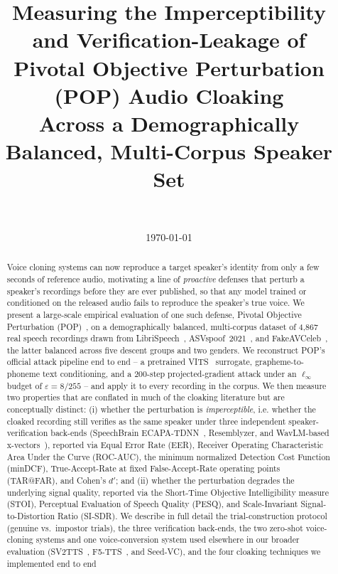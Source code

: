 \documentclass[11pt]{article}
\title{Measuring the Imperceptibility and Verification-Leakage of\\
Pivotal Objective Perturbation (POP) Audio Cloaking\\
Across a Demographically Balanced, Multi-Corpus Speaker Set}
\author{
  \todo{Author names}\\
  \todo{Affiliation}
}
\date{\today}
\begin{document}
\maketitle

\begin{abstract}
Voice cloning systems can now reproduce a target speaker's identity
from only a few seconds of reference audio, motivating a line of
\emph{proactive} defenses that perturb a speaker's recordings before
they are ever published, so that any model trained or conditioned on
the released audio fails to reproduce the speaker's true voice. We
present a large-scale empirical evaluation of one such defense,
Pivotal Objective Perturbation (POP)~\cite{zhang2024mitigating}, on a
demographically balanced, multi-corpus dataset of 4,867 real speech
recordings drawn from LibriSpeech~\cite{panayotov2015librispeech},
ASVspoof~2021~\cite{yamagishi2021asvspoof}, and
FakeAVCeleb~\cite{khalid2021fakeavceleb}, the latter balanced across
five descent groups and two genders. We reconstruct POP's official
attack pipeline end to end -- a pretrained VITS~\cite{kim2021vits}
surrogate, grapheme-to-phoneme text conditioning, and a 200-step
projected-gradient attack under an $\ell_\infty$ budget of
$\varepsilon=8/255$ -- and apply it to every recording in the corpus.
We then measure two properties that are conflated in much of the
cloaking literature but are conceptually distinct: (i) whether the
perturbation is \emph{imperceptible}, i.e. whether the cloaked
recording still verifies as the same speaker under three independent
speaker-verification back-ends (SpeechBrain
ECAPA-TDNN~\cite{desplanques2020ecapa}, Resemblyzer, and
WavLM-based x-vectors~\cite{chen2022wavlm}), reported via Equal Error
Rate (EER), Receiver Operating Characteristic Area Under the Curve
(ROC-AUC), the minimum normalized Detection Cost Function (minDCF),
True-Accept-Rate at fixed False-Accept-Rate operating points
(TAR@FAR), and Cohen's $d'$; and (ii) whether the perturbation
degrades the underlying signal quality, reported via the Short-Time
Objective Intelligibility measure (STOI), Perceptual Evaluation of
Speech Quality (PESQ), and Scale-Invariant Signal-to-Distortion Ratio
(SI-SDR). We describe in full detail the trial-construction protocol
(genuine vs.\ impostor trials), the three verification back-ends, the
two zero-shot voice-cloning systems and one voice-conversion system
used elsewhere in our broader evaluation
(SV2TTS~\cite{jia2018transfer}, F5-TTS~\cite{chen2024f5tts}, and
Seed-VC), and the four cloaking techniques we implemented end to end

\end{abstract}
\end{document}
